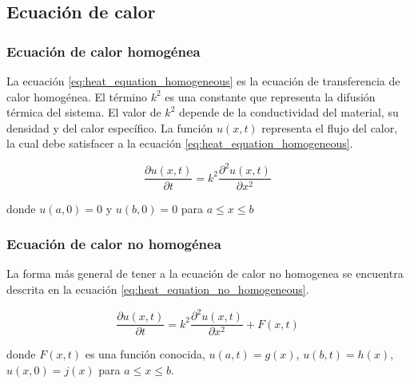 \subsection{Ecuación de calor}

\subsubsection{Ecuación de calor homogénea}

La ecuación \ref{eq:heat_equation_homogeneous} es la ecuación de transferencia de calor homogénea. El término $k^2$ es una constante que representa la difusión térmica del sistema. El valor de $k^2$ depende de la conductividad del material, su densidad y del calor específico. La función $u(x,t)$ representa el flujo del calor, la cual debe satisfacer a la ecuación \ref{eq:heat_equation_homogeneous}.

\begin{equation}
    \frac{\partial u(x,t)}{\partial t} = k^2 \frac{\partial^2 u(x,t)}{\partial x^2} \label{eq:heat_equation_homogeneous}
\end{equation}

donde $u(a,0)=0$ y $u(b,0)=0$ para $a\leq x \leq b$

\subsubsection{Ecuación de calor no homogénea}


La forma más general de tener a la ecuación de calor no homogenea se encuentra descrita en la ecuación \ref{eq:heat_equation_no_homogeneous}.

\begin{equation}
    \frac{\partial u(x,t)}{\partial t} = k^2 \frac{\partial^2 u(x,t)}{\partial x^2}+F(x,t) \label{eq:heat_equation_no_homogeneous}
\end{equation}

donde $F(x,t)$ es una función conocida, $u(a,t)=g(x)$, $u(b,t)=h(x)$, $u(x,0)=j(x)$ para $a\leq x \leq b$.